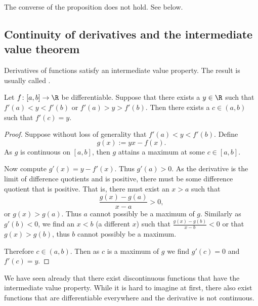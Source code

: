 \documentclass[12pt]{book}
\begin{document}
The converse of the proposition does not hold.
See
 below.

\subsection*{Continuity of derivatives and the intermediate value theorem}

Derivatives of functions satisfy an
intermediate value property.
The result is usually
called .

\begin{thm}[Darboux] \label{thm:darboux}
Let $f \colon [a,b] \to \R$ be differentiable.
Suppose that there exists
a $y \in \R$ such that $f'(a) < y < f'(b)$ or
$f'(a) > y > f'(b)$.
Then there exists a $c \in (a,b)$ such that $f'(c) =
y$.
\end{thm}

\begin{proof}
Suppose without loss of generality that
$f'(a) < y < f'(b)$.
Define
\begin{equation*}
g(x) := yx - f(x) .
\end{equation*}
As $g$ is continuous on $[a,b]$, then $g$ attains a maximum at some $c \in
[a,b]$.

Now compute $g'(x) = y-f'(x)$.
Thus $g'(a) > 0$.
As the derivative is
the limit of difference quotients and is positive, there must be some
difference quotient that is positive.
That is, there must exist
an $x > a$ such that
\begin{equation*}
\frac{g(x)-g(a)}{x-a} > 0 ,
\end{equation*}
or $g(x) > g(a)$.
Thus $a$
cannot possibly be a maximum of $g$.
Similarly as $g'(b) < 0$,
we find an $x < b$ (a different $x$) such that
$\frac{g(x)-g(b)}{x-b} < 0$ or that $g(x) > g(b)$, thus
$b$ cannot possibly be a maximum.

Therefore $c \in (a,b)$.
Then as $c$ is a maximum of $g$ we find $g'(c) = 0$
and $f'(c) = y$.
\end{proof}

We have seen already that
there exist discontinuous functions that have the
intermediate value property.
While it is hard to imagine at first, there
also
exist functions that are differentiable everywhere and the derivative is not
continuous.
\end{document}
